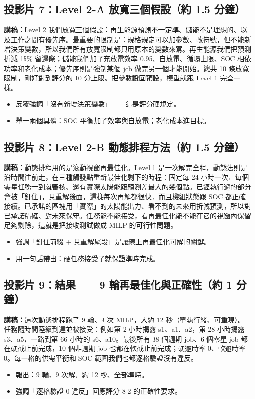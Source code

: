 \documentclass[12pt,a4paper,fontset=none]{ctexart}
\begin{document}
\subsection*{投影片 7：Level 2-A 放寬三個假設（約 1.5 分鐘）}
\textbf{講稿：}Level 2 我們放寬三個假設：再生能源預測不一定準、儲能不是理想的、以及工作之間有優先序。最重要的限制是：規格規定可以加參數、改符號，但不能新增決策變數，所以我們所有放寬限制都只用原本的變數來寫。再生能源我們把預測折減 15\% 留邊際；儲能我們加了充放電效率 0.95、自放電、循環上限、SOC 相依功率和老化成本；優先序則是強制某個 job 做完另一個才能開始。總共 10 條放寬限制，剛好對到評分的 10 分上限。把參數設回預設，模型就跟 Level 1 完全一樣。
\begin{itemize}
  \item 反覆強調「沒有新增決策變數」——這是評分硬規定。
  \item 舉一兩個具體：SOC 平衡加了效率與自放電；老化成本進目標。
\end{itemize}

\subsection*{投影片 8：Level 2-B 動態排程方法（約 1.5 分鐘）}
\textbf{講稿：}動態排程用的是滾動視窗再最佳化。Level 1 是一次解完全程，動態法則是沿時間往前走，在三種觸發點重新最佳化剩下的時程：固定每 24 小時一次、每個零星任務一到就審核、還有實際太陽能跟預測差最大的幾個點。已經執行過的部分會被「釘住」，只重解後面，這樣每次再解都很快，而且機組狀態跟 SOC 都正確接續。已承諾的區塊用「實際」的太陽能出力、看不到的未來用折減預測，所以對已承諾精確、對未來保守。任務能不能接受，看再最佳化能不能在它的視窗內保留足夠剩餘，這就是把接收測試做成 MILP 的可行性問題。
\begin{itemize}
  \item 強調「釘住前綴 $+$ 只重解尾段」是讓線上再最佳化可解的關鍵。
  \item 用一句話帶出：硬任務接受了就保證準時完成。
\end{itemize}

\subsection*{投影片 9：結果——9 輪再最佳化與正確性（約 1 分鐘）}
\textbf{講稿：}這次動態排程跑了 9 輪、9 次 MILP，大約 12 秒（單執行緒、可重現）。任務隨時間陸續到達並被接受：例如第 2 小時揭露 s1、a1、a2，第 28 小時揭露 s3、a5，一路到第 66 小時的 s6、a10。最後所有 38 個週期 job、6 個零星 job 都在硬截止前完成，10 個非週期 job 也都在軟截止前完成；硬逾時率 0、軟逾時率 0。每一格的供需平衡和 SOC 範圍我們也都逐格驗證沒有違反。
\begin{itemize}
  \item 報出：9 輪、9 次解、約 12 秒、全部準時。
  \item 強調「逐格驗證 0 違反」回應評分 8-2 的正確性要求。
\end{itemize}
\end{document}

